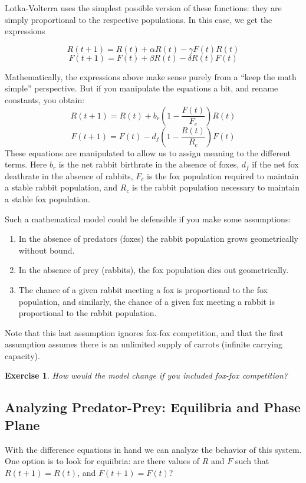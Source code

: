 \documentclass{tufte-handout}
\newtheorem{del}{Exercise}
\begin{document}
Lotka-Volterra uses the simplest possible version of these functions:  they are simply proportional to the respective populations.  In this case, we get the expressions

$$R(t+1) = R(t) + \alpha R(t) - \gamma F(t) R(t)$$
$$F(t+1) = F(t) + \beta R(t) - \delta R(t) F(t)$$

Mathematically, the expressions above make sense purely from a ``keep the math simple'' perspective.  But if you manipulate the equations a bit, and rename constants,  you obtain:
$$R(t+1) = R(t) + b_r (1 - \frac{F(t)}{F_c}) R(t)$$
$$F(t+1) = F(t) - d_f (1-\frac{R(t)}{R_c}) F(t)$$
These equations are manipulated to allow us to assign meaning to the different terms.  Here $b_r$ is the net rabbit birthrate in the absence of foxes, $d_f$ if the net fox deathrate in the absence of rabbits, $F_c$ is the fox population required to maintain a stable rabbit population, and $R_c$ is the rabbit population necessary to maintain a stable fox population.

Such a mathematical model could be defensible if you make some assumptions:
\begin{enumerate}
\item In the absence of predators (foxes) the rabbit population grows geometrically without bound.
\item In the absence of prey (rabbits), the fox population dies out geometrically.
\item The chance of a given rabbit meeting a fox is proportional to the fox population, and similarly, the chance of a given fox meeting a rabbit is proportional to the rabbit population. 
\end{enumerate}
Note that this last assumption ignores fox-fox competition, and that the first assumption assumes there is an unlimited supply of carrots (infinite carrying capacity).  

\begin{del}
How would the model change if you included fox-fox competition?
\end{del}


\subsection*{Analyzing Predator-Prey: Equilibria and Phase Plane}

With the difference equations in hand  we can analyze the behavior of this system.  One option is to look for equiibria: are there values of $R$ and $F$ such that $R(t+1) = R(t)$, and $F(t+1) = F(t)$?  
\end{document}
